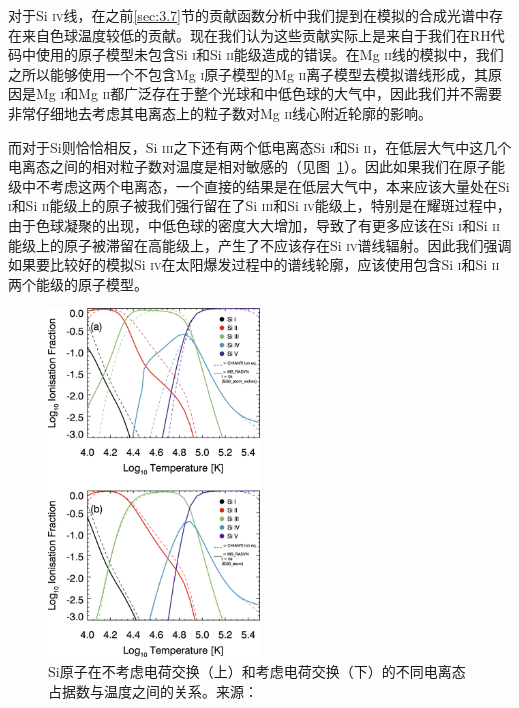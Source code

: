对于Si \textsc{iv}线，在之前\ref{sec:3.7}节的贡献函数分析中我们提到在模拟的合成光谱中存在来自色球温度较低的贡献。现在我们认为这些贡献实际上是来自于我们在RH代码中使用的原子模型未包含Si \textsc{i}和Si \textsc{ii}能级造成的错误。在Mg \textsc{ii}线的模拟中，我们之所以能够使用一个不包含Mg \textsc{i}原子模型的Mg \textsc{ii}离子模型去模拟谱线形成，其原因是Mg \textsc{i}和Mg \textsc{ii}都广泛存在于整个光球和中低色球的大气中，因此我们并不需要非常仔细地去考虑其电离态上的粒子数对Mg \textsc{ii}线心附近轮廓的影响。

而对于Si则恰恰相反，Si \textsc{iii}之下还有两个低电离态Si \textsc{i}和Si \textsc{ii}，在低层大气中这几个电离态之间的相对粒子数对温度是相对敏感的（见图~\ref{fig:3.16}）。因此如果我们在原子能级中不考虑这两个电离态，一个直接的结果是在低层大气中，本来应该大量处在Si \textsc{i}和Si \textsc{ii}能级上的原子被我们强行留在了Si \textsc{iii}和Si \textsc{iv}能级上，特别是在耀斑过程中，由于色球凝聚的出现，中低色球的密度大大增加，导致了有更多应该在Si \textsc{i}和Si \textsc{ii}能级上的原子被滞留在高能级上，产生了不应该存在Si \textsc{iv}谱线辐射。因此我们强调如果要比较好的模拟Si \textsc{iv}在太阳爆发过程中的谱线轮廓，应该使用包含Si \textsc{i}和Si \textsc{ii}两个能级的原子模型。
\begin{figure}
	\centering
	\includegraphics[width=0.5\textwidth]{figs/Si_pop}
	\caption{Si原子在不考虑电荷交换（上）和考虑电荷交换（下）的不同电离态占据数与温度之间的关系。来源：\textcites{Kerr2019}}
	\label{fig:3.16}
\end{figure}


